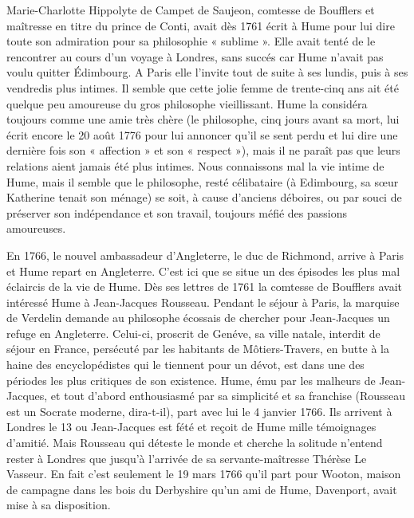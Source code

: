 Marie-Charlotte Hippolyte de Campet de Saujeon,
comtesse de Boufflers et maîtresse en titre du prince
de Conti, avait dès 1761 écrit à Hume pour lui dire
toute son admiration pour sa philosophie « sublime ».
Elle avait tenté de le rencontrer au cours d’un voyage
à Londres, sans succés car Hume n’avait pas voulu
quitter Édimbourg. A Paris elle l'invite tout de
suite à ses lundis, puis à ses vendredis plus intimes.
Il semble que cette jolie femme de trente-cinq ans
ait été quelque peu amoureuse du gros philosophe
vieillissant. Hume la considéra toujours comme une
amie très chère (le philosophe, cinq jours avant sa
mort, lui écrit encore le 20 août 1776 pour lui
annoncer qu’il se sent perdu et lui dire une dernière
fois son « affection » et son « respect »), mais il ne
paraît pas que leurs relations aient jamais été plus
intimes. Nous connaissons mal la vie intime de Hume,
mais il semble que le philosophe, resté célibataire
(à Edimbourg, sa s{\oe}ur Katherine tenait son ménage)
se soit, à cause d’anciens déboires, ou par souci de
préserver son indépendance et son travail, toujours
méfié des passions amoureuses.

En 1766, le nouvel ambassadeur d’Angleterre, le
duc de Richmond, arrive à Paris et Hume repart
en Angleterre. C’est ici que se situe un des épisodes
les plus mal éclaircis de la vie de Hume. Dès ses
lettres de 1761 la comtesse de Boufflers avait intéressé
Hume à Jean-Jacques Rousseau. Pendant le
séjour à Paris, la marquise de Verdelin demande au
philosophe écossais de chercher pour Jean-Jacques
un refuge en Angleterre. Celui-ci, proscrit de Genéve,
sa ville natale, interdit de séjour en France, persécuté
par les habitants de Môtiers-Travers, en butte à la
haine des encyclopédistes qui le tiennent pour un
dévot, est dans une des périodes les plus critiques de
son existence. Hume, ému par les malheurs de
Jean-Jacques, et tout d’abord enthousiasmé par sa
simplicité et sa franchise (Rousseau est un Socrate
moderne, dira-t-il), part avec lui le 4 janvier 1766.
Ils arrivent à Londres le 13 ou Jean-Jacques est
fété et reçoit de Hume mille témoignages d’amitié.
Mais Rousseau qui déteste le monde et cherche la
solitude n’entend rester à Londres que jusqu’à
l'arrivée de sa servante-maîtresse Thérèse Le Vasseur.
En fait c’est seulement le 19 mars 1766 qu’il part
pour Wooton, maison de campagne dans les bois du
Derbyshire qu’un ami de Hume, Davenport, avait
mise à sa disposition.

